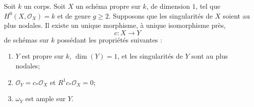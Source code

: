 \begin{lemma}
\label{lemma-characterize-contraction-to-stable}
Soit $k$ un corps. Soit $X$ un schéma propre sur $k$, de dimension $1$, tel que $H^0(X, \mathcal{O}_X) = k$ et de genre $g \geq 2$. Supposons que les singularités de $X$ soient au plus nodales. Il existe un unique morphisme, à unique isomorphisme près, $$
c : X \longrightarrow Y
$$ de schémas sur $k$ possédant les propriétés suivantes : \begin{enumerate} \item $Y$ est propre sur $k$, $\dim(Y) = 1$, et les singularités de $Y$ sont au plus nodales; \item $\mathcal{O}_Y = c_*\mathcal{O}_X$ et $R^1c_*\mathcal{O}_X = 0$; \item $\omega_Y$ est ample sur $Y$.
\end{enumerate}
\end{lemma}

